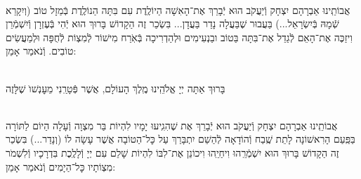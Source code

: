 \documentclass[twoside, openany, parskip=half, 11pt]{book}
\begin{document}
\begin{small}
\\
אֲבוֹתֵֽינוּ אַבְרָהָם יִצְחָק וְֿיַעֲקֹב הוּא יְֿבָרֵךְ אֶת־הָאִשָׁה הַיוֹלֶֽדֶת
עִם בִּתָּה הַנוֹלֶֽדֶת בְּֿמַזָל טוֹב (וְיִקָרֵא שְֿׁמָהּ בְּֿיִשְׂרָאֵל...) בַּעֲבוּר שֶׁבַּעֲלָה נָדַר בַּעֲדָן... בִּשְׂכַר זֶה הַקָדוֹשׁ בָּרוּךְ הוּא יְֿהִי בְּֿעֶזְרָן וְֿיִשְׁמְֿרֵן וִיזַכֶּה אֶת־הָאֵם לְֿגַדֵל אֶת־בִּתָּה בַּטוֹב ובַנְעִימִים וּלְהַדְרִיכָה בְּֿאֹֽרַח מִישׁוֹר לְֿמִצְוֹת לְֿחֻפָּה וּלְמַעֲשִׂים טוֹבִים. וְֿנֹאמַר אָמֵן:


\\
בָּרוּךְ אַתָּה יְיָ אֱלֹהֵֽינוּ מֶֽלֶךְ הָעוֹלָם, אֲשֶׁר פְּֿטָרַֽנִי מֵעׇנְשׁוׂ שֶׁלָּזֶה

\\
אֲבוֹתֵֽינוּ אַבְרָהָם יִצְחָק וְֿיַעֲקֹב הוּא יְֿבָרֵךְ אֶת
שֶׁהִגִֽיעוּ יָמָיו לִהְיוֹת בַּר מִצְוָה וְֿעָלָה הַיוֹם לַתּוֹרָה בַּפַּֽעַם הָרִאשׁוֹנָה לָתֵת שֶֽׁבַח וְֿהוֹדָאָה לְֿהַשֵׁם יִתְבָּרַךְ עַל כׇּל־הַטוֹבָה אֲשֶׁר עָשָׂה לוֹ (וְנָדַר...) בִּשְׂכַר זֶה הַקָדוֹשׁ בָּרוּךְ הוּא יִשְׁמְֿרֵֽהוּ וִיחַיֵֽהוּ וִיכוֹנֵן אֶת־לִבּוֹ לִהְיוֹת שָׁלֵם עִם יְיָ וְֿלָלֶֽכֶת בִּדְרָכָיו וְֿלִשְׁמֹר מִצְוֹתָיו כׇּל־הַיָמִים וְֿנֹאמַר אָמֵן:


\end{small}

\sepline

\\
\halfkaddish


\newcommand{\hagbaha}{
	\instruction{הגבה:}
	\firstword{וְזֹ֖את הַתּוֹרָ֑ה}\source{דברים ד}
	אֲשֶׁר־שָׂ֣ם מֹשֶׁ֔ה לִפְנֵ֖י בְּנֵ֥י יִשְׂרָאֵֽל׃
	עַל־פִּ֥י \source{במדבר ט}יְיָ֖ בְּיַד־מֹשֶֽׁה׃
	עֵץ־חַיִּ֣ים \source{משלי ג} הִ֭יא לַמַּחֲזִיקִ֣ים בָּ֑הּ וְֽתֹמְכֶ֥יהָ מְאֻשָּֽׁר׃ 
	דְּרָכֶ֥יהָ דַרְכֵי־נֹ֑עַם וְֽכׇל־נְתִ֖יבוֹתֶ֣יהָ שָׁלֽוֹם׃ 
	אֹ֣רֶךְ יָ֭מִים בִּֽימִינָ֑הּ בִּ֝שְׂמֹאולָ֗הּ עֹ֣שֶׁר וְכָבֽוֹד׃ 
	יְיָ֥ \source{ישעיה מב}חָפֵ֖ץ לְמַ֣עַן צִדְק֑וֹ יַגְדִּ֥יל תּוֹרָ֖ה וְיַאְדִּֽיר׃
	
}


\newcommand{\yehalelu}{
	\shatz
	\begin{large}
		\textbf{יְהַלְל֤וּ ׀ אֶת־שֵׁ֬ם יְהֹוָ֗ה כִּֽי־נִשְׂגָּ֣ב שְׁמ֣וֹ לְבַדּ֑וֹ}\source{תהלים קמח}
	\end{large}
	
	\kahal
	ה֝וֹד֗וֹ עַל־אֶ֥רֶץ וְשָׁמָֽיִם׃ וַיָּ֤רֶם קֶ֨רֶן ׀ לְעַמּ֡וֹ תְּהִלָּ֤ה לְֽכׇל־חֲסִידָ֗יו לִבְנֵ֣י יִ֭שְׂרָאֵל עַ֥ם קְרֹב֗וֹ הַֽלְלוּ־יָֽהּ׃ 
}
\end{document}
